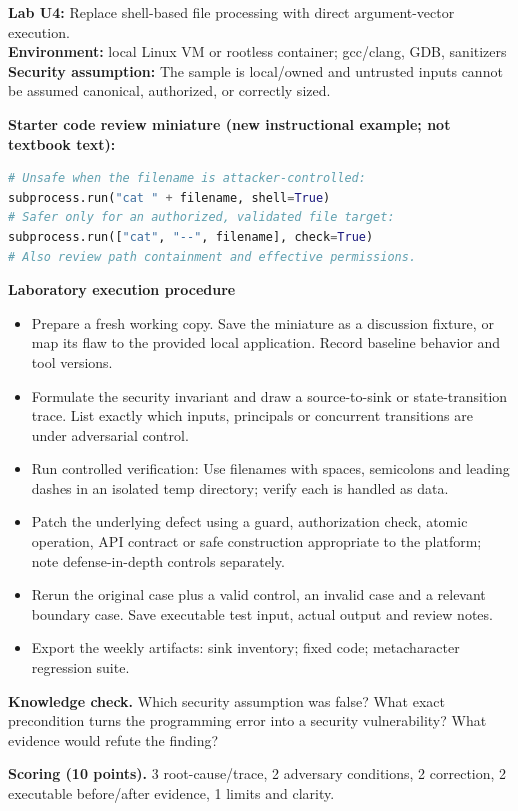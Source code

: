 \documentclass[10pt,letterpaper]{article}
\begin{document}
\begin{insight}\textbf{Lab U4:} Replace shell-based file processing with direct argument-vector execution.\\\textbf{Environment:} local Linux VM or rootless container; gcc/clang, GDB, sanitizers\\\textbf{Security assumption:} The sample is local/owned and untrusted inputs cannot be assumed canonical, authorized, or correctly sized.\end{insight}
\textbf{Starter code review miniature (new instructional example; not textbook text):}
\begin{lstlisting}[language=Python]
# Unsafe when the filename is attacker-controlled:
subprocess.run("cat " + filename, shell=True)
# Safer only for an authorized, validated file target:
subprocess.run(["cat", "--", filename], check=True)
# Also review path containment and effective permissions.
\end{lstlisting}
\textbf{Laboratory execution procedure}
\begin{itemize}[leftmargin=*,itemsep=2pt]
\item Prepare a fresh working copy. Save the miniature as a discussion fixture, or map its flaw to the provided local application. Record baseline behavior and tool versions.
\item Formulate the security invariant and draw a source-to-sink or state-transition trace. List exactly which inputs, principals or concurrent transitions are under adversarial control.
\item Run controlled verification: Use filenames with spaces, semicolons and leading dashes in an isolated temp directory; verify each is handled as data.
\item Patch the underlying defect using a guard, authorization check, atomic operation, API contract or safe construction appropriate to the platform; note defense-in-depth controls separately.
\item Rerun the original case plus a valid control, an invalid case and a relevant boundary case. Save executable test input, actual output and review notes.
\item Export the weekly artifacts: sink inventory; fixed code; metacharacter regression suite.
\end{itemize}
\textbf{Knowledge check.} Which security assumption was false? What exact precondition turns the programming error into a security vulnerability? What evidence would refute the finding?

\textbf{Scoring (10 points).} 3 root-cause/trace, 2 adversary conditions, 2 correction, 2 executable before/after evidence, 1 limits and clarity.
\end{document}
